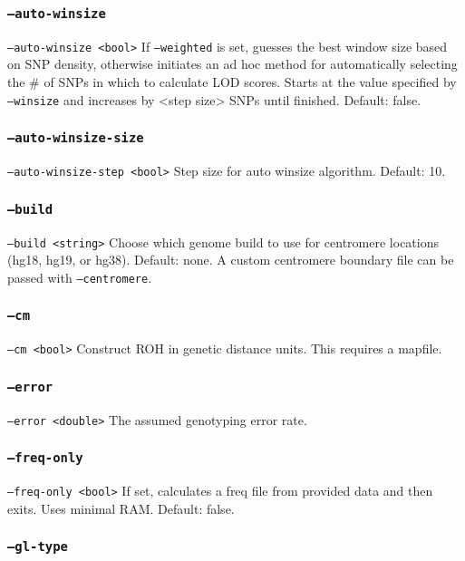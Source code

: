 \documentclass[12pt]{article}%
\begin{document}
\subsubsection{{\tt --auto-winsize}}

{\tt --auto-winsize <bool>} If {\tt --weighted} is set, guesses the best window size based on SNP density, otherwise initiates an ad hoc method for automatically selecting the \# of SNPs in which to calculate LOD scores. Starts at the value specified by {\tt --winsize} and increases by <step size> SNPs until finished. Default: false.

\subsubsection{{\tt --auto-winsize-size}}
{\tt --auto-winsize-step <bool>} Step size for auto winsize algorithm. Default: 10.

\subsubsection{{\tt --build}}

{\tt --build <string>} Choose which genome build to use for centromere locations (hg18, hg19, or hg38). Default: none. A custom centromere boundary file can be passed with {\tt --centromere}.

\subsubsection{{\tt --cm}}

{\tt --cm <bool>} Construct ROH in genetic distance units. This requires a mapfile.

\subsubsection{{\tt --error}}

{\tt --error <double>} The assumed genotyping error rate.

\subsubsection{{\tt --freq-only}}

{\tt --freq-only <bool>} If set, calculates a freq file from provided data and then exits. Uses minimal RAM. Default: false.

\subsubsection{{\tt --gl-type}}
\end{document}
